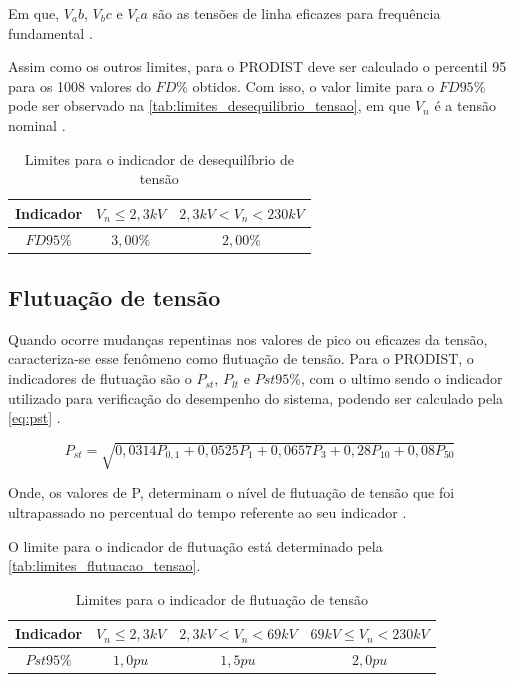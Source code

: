 Em que, $V_ab$, $V_bc$ e $V_ca$ são as tensões de linha eficazes para frequência fundamental \cite{ref:ANEEL2021}.

Assim como os outros limites, para o PRODIST deve ser calculado o percentil 95 para os 1008 valores do $FD\%$ obtidos. Com isso, o valor limite para o $FD95\%$ pode ser observado na \autoref{tab:limites_desequilibrio_tensao}, em que $V_n$ é a tensão nominal \cite{ref:ANEEL2021}.

\begin{table}[H]
  \centering
  \caption{Limites para o indicador de desequilíbrio de tensão}
  \label{tab:limites_desequilibrio_tensao}
  \begin{tabular}{@{}ccc@{}}
  \toprule
  \textbf{Indicador} & \textbf{$V_n \leq  2,3 kV$} & \textbf{$2,3 kV < V_n  < 230 kV$} \\ \midrule
  $FD95\%$ & $3,00\%$ & $2,00\%$ \\ \bottomrule
  \end{tabular}
\end{table}

\subsection{Flutuação de tensão}

Quando ocorre mudanças repentinas nos valores de pico ou eficazes da tensão, caracteriza-se esse fenômeno como flutuação de tensão. Para o PRODIST, o indicadores de flutuação são o $P_{st}$, $P_{lt}$ e $P{st}95\%$, com o ultimo sendo o indicador utilizado para verificação do desempenho do sistema, podendo ser calculado pela \autoref{eq:pst} \cite{ref:ANEEL2021}.

\begin{equation}
P_{st}=\sqrt{0,0314 P_{0,1}+0,0525 P_1+0,0657 P_3+0,28 P_{10}+0,08 P_{50}}
\label{eq:pst}
\end{equation}

Onde, os valores de P, determinam o nível de flutuação de tensão que foi ultrapassado no percentual do tempo referente ao seu indicador \cite{ref:ANEEL2021}.

O limite para o indicador de flutuação está determinado pela \autoref{tab:limites_flutuacao_tensao}.

\begin{table}[H]
  \centering
  \caption{Limites para o indicador de flutuação de tensão}
  \label{tab:limites_flutuacao_tensao}
  \begin{tabular}{@{}cccc@{}}
  \toprule
  \textbf{Indicador} & \textbf{$V_n \leq  2,3 kV$} & \textbf{$2,3 kV < V_n  < 69 kV$} & \textbf{$69 kV \leq V_n  < 230 kV$} \\ \midrule
  $P{st}95\%$ & $1,0 pu$ & $1,5 pu$ & $2,0 pu$ \\ \bottomrule
  \end{tabular}
\end{table}

